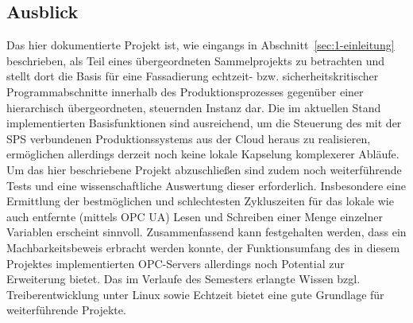 \subsection{Ausblick%
     \label{sec:6-ausblick}}
Das hier dokumentierte Projekt ist, wie eingangs in Abschnitt~\ref{sec:1-einleitung} beschrieben, als Teil eines übergeordneten Sammelprojekts zu betrachten und stellt dort die Basis für eine Fassadierung echtzeit- bzw. sicherheitskritischer Programmabschnitte innerhalb des Produktionsprozesses gegenüber einer hierarchisch übergeordneten, steuernden Instanz dar.
Die im aktuellen Stand implementierten Basisfunktionen sind ausreichend, um die Steuerung des mit der SPS verbundenen Produktionssystems aus der Cloud heraus zu realisieren, ermöglichen allerdings derzeit noch keine lokale Kapselung komplexerer Abläufe.
Um das hier beschriebene Projekt abzuschließen sind zudem noch weiterführende Tests und eine
wissenschaftliche Auswertung dieser erforderlich. 
Insbesondere eine Ermittlung der bestmöglichen und schlechtesten Zykluszeiten für das lokale wie 
auch entfernte (mittels OPC UA) Lesen und Schreiben einer Menge einzelner Variablen erscheint sinnvoll.
Zusammenfassend kann festgehalten werden, dass ein Machbarkeitsbeweis erbracht werden konnte, der Funktionsumfang des in diesem Projektes implementierten OPC-Servers allerdings noch Potential zur Erweiterung bietet.
Das im Verlaufe des Semesters erlangte Wissen bzgl.\, Treiberentwicklung unter Linux sowie Echtzeit bietet eine gute Grundlage für
weiterführende Projekte.